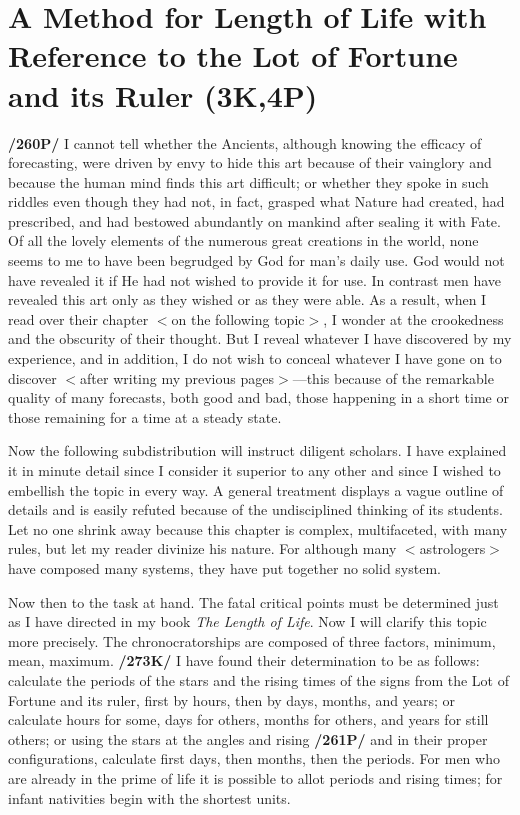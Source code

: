 \section{A Method for Length of Life with Reference to the Lot of Fortune and its Ruler (3K,4P)}

\textbf{/260P/} I cannot tell whether the Ancients, although knowing the efficacy of forecasting, were driven by envy to hide this art because of their vainglory and because the human mind finds this art difficult; or whether they spoke in such riddles even though they had not, in fact, grasped what Nature had created, had prescribed, and had bestowed abundantly on mankind after sealing it with Fate. Of all the lovely elements of the numerous great creations in the world, none seems to me to have been begrudged by God for man’s daily use. God would not have revealed it if He had not wished to provide it for use. In contrast men have revealed this art only as they wished or as they were able. As a result, when I read over their chapter $<$on the following topic$>$, I wonder at the crookedness and the obscurity of their thought. But I reveal whatever I have discovered by my experience, and in addition, I do not wish to conceal whatever I have gone on to
discover $<$after writing my previous pages$>$—this because of the remarkable quality of many forecasts, both good and bad, those happening in a short time or those remaining for a time at a steady state.

Now the following subdistribution will instruct diligent scholars. I have explained it in minute detail since I consider it superior to any other and since I wished to embellish the topic in every way. A general treatment displays a vague outline of details and is easily refuted because of the undisciplined thinking of its students. Let no one shrink away because this chapter is complex, multifaceted, with many rules, but let my reader divinize his nature. For although many $<$astrologers$>$ have composed many systems, they have put together no solid system.

Now then to the task at hand. The fatal critical points must be determined just as I have directed in my book \textit{The Length of Life}. Now I will clarify this topic more precisely. The chronocratorships are composed of three factors, minimum, mean, maximum. \textbf{/273K/} I have found their determination to be as follows: calculate the periods of the stars and the rising times of the signs from the Lot of Fortune and its ruler, first by hours, then by days, months, and years; or calculate hours for some, days for others, months for others, and years for still others; or using the stars at the angles and rising \textbf{/261P/} and in their proper configurations, calculate first days, then months, then the periods. For men who are already in the prime of life it is possible to allot periods and rising times; for infant nativities begin with the shortest units.

